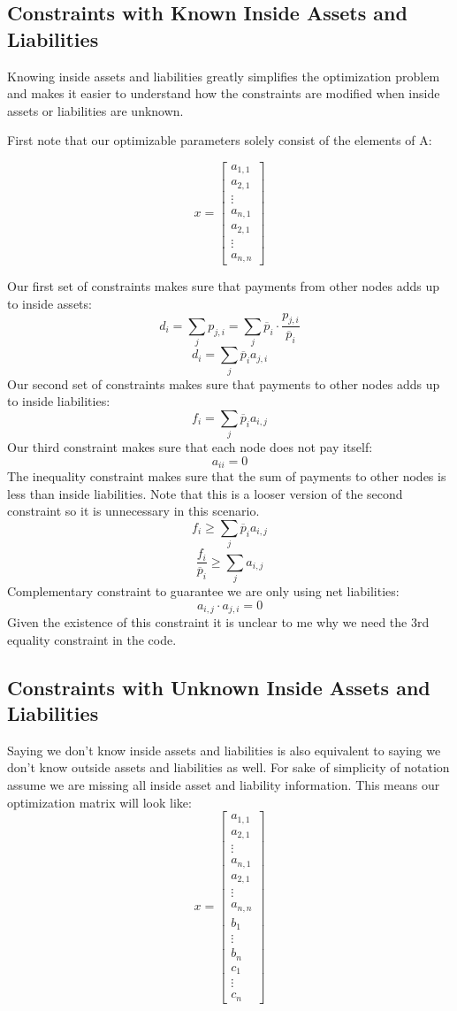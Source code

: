 \documentclass{article}
\newcommand{\?}{\stackrel{?}{=}}
\newcommand{\pbar}{\overline{p}}
\begin{document}
\subsection{Constraints with Known Inside Assets and Liabilities}
Knowing inside assets and liabilities greatly simplifies the optimization problem and makes it easier to understand how the constraints are modified when inside assets or liabilities are unknown. 

First note that our optimizable parameters solely consist of the elements of A:

$$x= 
\begin{bmatrix}
a_{1,1} \\
a_{2,1} \\
\vdots \\
a_{n,1} \\
a_{2,1} \\
\vdots \\
a_{n,n}
\end{bmatrix}
$$

\noindent Our first set of constraints makes sure that payments from other nodes adds up to inside assets:
$$d_i = \sum_j p_{j,i} = \sum_j \pbar_i \cdot \frac{p_{j,i}}{\pbar_i}$$
$$d_i=\sum_j \pbar_i a_{j,i}$$
Our second set of constraints makes sure that payments to other nodes adds up to inside liabilities:
$$f_i=\sum_j \pbar_i a_{i,j}$$
Our third constraint makes sure that each node does not pay itself:
$$a_{ii}=0$$
The inequality constraint makes sure that the sum of payments to other nodes is less than inside liabilities. Note that this is a looser version of the second constraint so it is unnecessary in this scenario. 
$$f_i\geq \sum_j \pbar_i a_{i,j}$$
$$\frac{f_i}{\pbar_i} \geq \sum_j a_{i,j}$$
Complementary constraint to guarantee we are only using net liabilities:
$$a_{i,j}\cdot a_{j,i}=0$$
Given the existence of this constraint it is unclear to me why we need the 3rd equality constraint in the code. 

\subsection{Constraints with Unknown Inside Assets and Liabilities}
Saying we don't know inside assets and liabilities is also equivalent to saying we don't know outside assets and liabilities as well. For sake of simplicity of notation assume we are missing all inside asset and liability information. This means our optimization matrix will look like:
$$x= 
\begin{bmatrix}
a_{1,1} \\
a_{2,1} \\
\vdots \\
a_{n,1} \\
a_{2,1} \\
\vdots \\
a_{n,n}\\
b_{1} \\
\vdots \\
b_n \\
c_1 \\
\vdots \\
c_n 
\end{bmatrix}
$$
\end{document}
